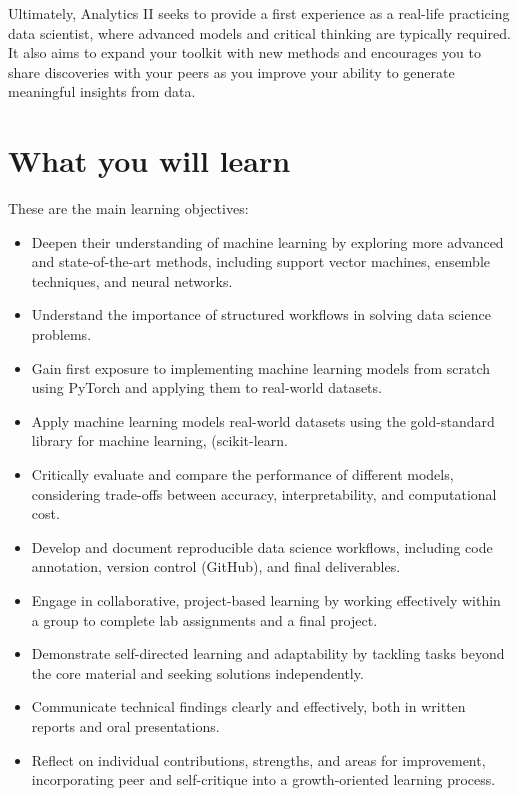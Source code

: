 \documentclass[12pt]{article}
\begin{document}
Ultimately, Analytics II seeks to provide a first experience as a real-life practicing data scientist, where advanced models and critical thinking are typically required. It also aims to expand your toolkit with new methods and encourages you to share discoveries with your peers as you improve your ability to generate meaningful insights from data.

\section*{What you will learn}

These are the main learning objectives:

\begin{itemize}[leftmargin=1.5em]
\item Deepen their understanding of machine learning by exploring more advanced and state-of-the-art methods, including support vector machines, ensemble techniques, and neural networks. 
\item Understand the importance of structured workflows in solving data science problems.
\item Gain first exposure to implementing machine learning models from scratch using PyTorch and applying them to real-world datasets.
\item Apply machine learning models real-world datasets using the gold-standard library for machine learning, (scikit-learn.
\item Critically evaluate and compare the performance of different models, considering trade-offs between accuracy, interpretability, and computational cost.
\item Develop and document reproducible data science workflows, including code annotation, version control (GitHub), and final deliverables.
\item Engage in collaborative, project-based learning by working effectively within a group to complete lab assignments and a final project.
\item Demonstrate self-directed learning and adaptability by tackling tasks beyond the core material and seeking solutions independently.
\item Communicate technical findings clearly and effectively, both in written reports and oral presentations.
\item Reflect on individual contributions, strengths, and areas for improvement, incorporating peer and self-critique into a growth-oriented learning process.
\end{itemize}
\end{document}
